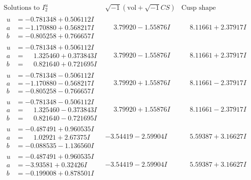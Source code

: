 \documentclass[1p]{elsarticle_modified}
\theoremstyle{definition}
\newcommand{\I}{\sqrt{-1}}
\begin{document}
$$\begin{array}{c|c|c}  
\text{Solutions to }I^u_{2}& \I (\text{vol} + \sqrt{-1}CS) & \text{Cusp shape}\\
 \hline 
\begin{aligned}
u &= -0.781348 + 0.506112 I \\
a &= -1.170880 + 0.568217 I \\
b &= -0.805258 + 0.766657 I\end{aligned}
 & \phantom{-}3.79920 - 1.55876 I & \phantom{-}8.11661 + 2.37917 I \\ \hline\begin{aligned}
u &= -0.781348 + 0.506112 I \\
a &= \phantom{-}1.325460 + 0.373843 I \\
b &= \phantom{-}0.821640 + 0.721695 I\end{aligned}
 & \phantom{-}3.79920 - 1.55876 I & \phantom{-}8.11661 + 2.37917 I \\ \hline\begin{aligned}
u &= -0.781348 - 0.506112 I \\
a &= -1.170880 - 0.568217 I \\
b &= -0.805258 - 0.766657 I\end{aligned}
 & \phantom{-}3.79920 + 1.55876 I & \phantom{-}8.11661 - 2.37917 I \\ \hline\begin{aligned}
u &= -0.781348 - 0.506112 I \\
a &= \phantom{-}1.325460 - 0.373843 I \\
b &= \phantom{-}0.821640 - 0.721695 I\end{aligned}
 & \phantom{-}3.79920 + 1.55876 I & \phantom{-}8.11661 - 2.37917 I \\ \hline\begin{aligned}
u &= -0.487491 + 0.960535 I \\
a &= \phantom{-}1.02921 + 2.67375 I \\
b &= -0.088535 - 1.136560 I\end{aligned}
 & -3.54419 - 2.59904 I & \phantom{-}5.59387 + 3.16627 I \\ \hline\begin{aligned}
u &= -0.487491 + 0.960535 I \\
a &= -3.93581 + 0.32426 I \\
b &= -0.199008 + 0.878501 I\end{aligned}
 & -3.54419 - 2.59904 I & \phantom{-}5.59387 + 3.16627 I \\ \hline\begin{aligned}

\end{aligned}
\end{array}$$
\end{document}
